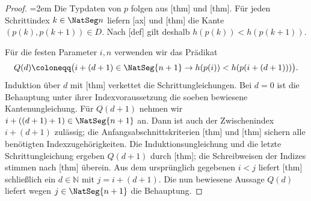 \begin{proof}
\emergencystretch=2em
Die Typdaten von \(p\) folgen aus
[thm] und
[thm]. Für jeden Schrittindex
\(k\in\NatSeg n\) liefern
[ax] und
[thm] die Kante
\((p(k),p(k+1))\in D\). Nach
[def] gilt deshalb
\(h(p(k))<h(p(k+1))\).

Für die festen Parameter \(i,n\) verwenden wir das Prädikat
\[
 Q(d)\coloneqq\bigl(i+(d+1)\in\NatSeg{n+1}\rightarrow
   h(p(i))<h(p(i+(d+1)))\bigr).
\]
Induktion über \(d\) mit
[thm] verkettet die Schrittungleichungen.
Bei \(d=0\) ist die Behauptung unter ihrer Indexvoraussetzung die
soeben bewiesene Kantenungleichung. Für \(Q(d+1)\) nehmen wir
\(i+((d+1)+1)\in\NatSeg{n+1}\) an. Dann ist auch der Zwischenindex
\(i+(d+1)\) zulässig; die Anfangsabschnittskriterien
[thm] und
[thm] sichern alle benötigten
Indexzugehörigkeiten. Die Induktionsungleichung und die letzte
Schrittungleichung ergeben \(Q(d+1)\) durch
[thm]; die Schreibweisen der Indizes
stimmen nach [thm] überein.
Aus dem ursprünglich gegebenen \(i<j\) liefert
[thm] schließlich ein
\(d\in\mathbb N\) mit \(j=i+(d+1)\). Die nun bewiesene Aussage
\(Q(d)\) liefert wegen \(j\in\NatSeg{n+1}\) die Behauptung.
\end{proof}

